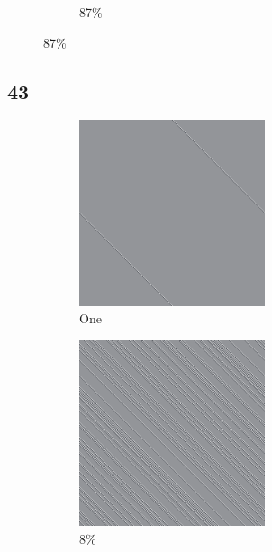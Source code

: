 \documentclass[12pt, fleqn]{report}                             %
\theoremstyle{break}                                            %
\begin{document}
\begin{figure}[ht!]
\begin{subfigure}[b]{0.4\linewidth}
          \caption{87\%}
        \end{subfigure}
      \end{figure}


      \clearpage
      \subsection{43}
      \begin{figure}[ht!]
        \centering
        \begin{subfigure}[b]{0.4\linewidth}
          \includegraphics[width=0.6\textwidth]{Images/43/a.png}
          \caption{One}
        \end{subfigure}
        \begin{subfigure}[b]{0.4\linewidth}
          \includegraphics[width=0.6\textwidth]{Images/43/b.png}
          \caption{8\%}
        \end{subfigure}
        \begin{subfigure}[b]{0.4\linewidth}

\end{subfigure}
\end{figure}
\end{document}
